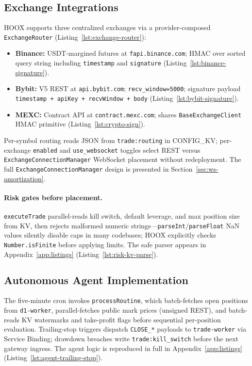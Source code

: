 \subsection{Exchange Integrations}

\textsc{HOOX} supports three centralized exchanges via a provider-composed \texttt{ExchangeRouter} (Listing~\ref{lst:exchange-router}):

\begin{itemize}
  \item \textbf{Binance:} USDT-margined futures at \texttt{fapi.binance.com}; HMAC over sorted query string including \texttt{timestamp} and \texttt{signature} (Listing~\ref{lst:binance-signature}).
  \item \textbf{Bybit:} V5 REST at \texttt{api.bybit.com}; \texttt{recv\_window=5000}; signature payload \texttt{timestamp + apiKey + recvWindow + body} (Listing~\ref{lst:bybit-signature}).
  \item \textbf{MEXC:} Contract API at \texttt{contract.mexc.com}; shares \texttt{BaseExchangeClient} HMAC primitive (Listing~\ref{lst:crypto-sign}).
\end{itemize}

Per-symbol routing reads JSON from \texttt{trade:routing} in CONFIG\_KV; per-exchange \texttt{enabled} and \texttt{use\_websocket} toggles select REST versus \texttt{ExchangeConnectionManager} WebSocket placement without redeployment. The full \texttt{ExchangeConnectionManager} design is presented in Section~\ref{sec:ws-amortization}.

\paragraph{Risk gates before placement.} \texttt{executeTrade} parallel-reads kill switch, default leverage, and max position size from KV, then rejects malformed numeric strings---\texttt{parseInt}/\texttt{parseFloat} NaN values silently disable caps in many codebases; \textsc{HOOX} explicitly checks \texttt{Number.isFinite} before applying limits. The safe parser appears in Appendix~\ref{app:listings} (Listing~\ref{lst:risk-kv-parse}).

\subsection{Autonomous Agent Implementation}

The five-minute cron invokes \texttt{processRoutine}, which batch-fetches open positions from \texttt{d1-worker}, parallel-fetches public mark prices (unsigned REST), and batch-reads KV watermarks and take-profit flags before sequential per-position evaluation. Trailing-stop triggers dispatch \texttt{CLOSE\_*} payloads to \texttt{trade-worker} via Service Binding; drawdown breaches write \texttt{trade:kill\_switch} before the next gateway ingress. The agent logic is reproduced in full in Appendix~\ref{app:listings} (Listing~\ref{lst:agent-trailing-stop}).


